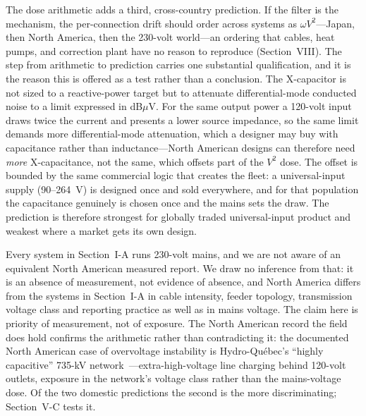 \documentclass[journal]{IEEEtran}
\begin{document}
The dose arithmetic adds a third, cross-country prediction. If the filter is
the mechanism, the per-connection drift should order across systems as
$\omega V^2$---Japan, then North America, then the 230-volt world---an
ordering that cables, heat pumps, and correction plant have no reason to
reproduce (Section~VIII). The step from arithmetic to prediction carries one substantial qualification, and
it is the reason this is offered as a test rather than a conclusion. The
X-capacitor is not sized to a reactive-power target but to attenuate
differential-mode conducted noise to a limit expressed in dB$\mu$V. For the same
output power a 120-volt input draws twice the current and presents a lower source
impedance, so the same limit demands more differential-mode attenuation, which a
designer may buy with capacitance rather than inductance---North American designs
can therefore need \emph{more} X-capacitance, not the same, which offsets part of
the $V^2$ dose. The offset is bounded by the same commercial logic that creates
the fleet: a universal-input supply (90--264~V) is designed once and sold
everywhere, and for that population the capacitance genuinely is chosen once and
the mains sets the draw. The prediction is therefore strongest for globally
traded universal-input product and weakest where a market gets its own design.

Every system in Section~I-A runs 230-volt mains, and we are not aware of an
equivalent North American measured report. We draw no inference from that: it is
an absence of measurement, not evidence of absence, and North America differs from
the systems in Section~I-A in cable intensity, feeder topology, transmission
voltage class and reporting practice as well as in mains voltage. The claim here
is priority of measurement, not of exposure. The North American record the field
does hold confirms the arithmetic rather than contradicting it: the documented
North American case of overvoltage instability is Hydro-Qu\'ebec's ``highly
capacitive'' 735-kV network~\cite{vournas2026review}---extra-high-voltage line
charging behind 120-volt outlets, exposure in the network's voltage class
rather than the mains-voltage dose. Of the two domestic predictions the
second is the more discriminating; Section~V-C tests it.
\end{document}
